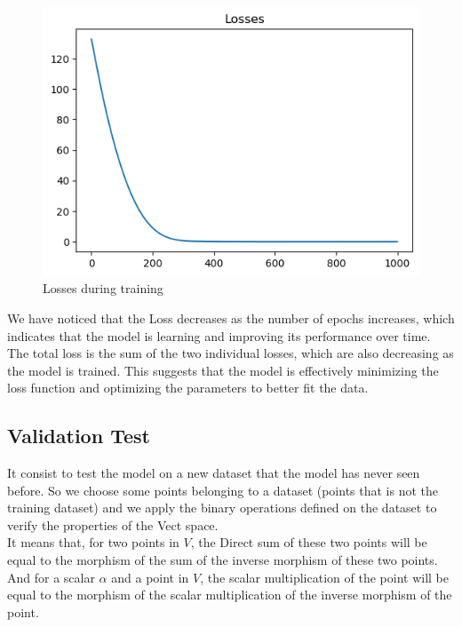 \documentclass{article}
\begin{document}
        \begin{figure}[h]
            \centering
            \includegraphics[width=\textwidth]{./images/losses.png}
            \caption{Losses during training}
            \label{fig:losses}
        \end{figure}

            \newpage


            We have noticed that the Loss decreases as the number of epochs increases, which indicates that the model is learning and improving its performance over time. The total loss is the sum of the two individual losses, which are also decreasing as the model is trained. This suggests that the model is effectively minimizing the loss function and optimizing the parameters to better fit the data.

        \subsection{Validation Test}

            It consist to test the model on a new dataset that the model has never seen before. So we choose some points belonging to a dataset (points that is not the training dataset) and we apply the binary operations defined on the dataset to verify the properties of the Vect space. \\
            It means that, for two points in $V$, the Direct sum of these two points will be equal to the morphism of the sum of the inverse morphism of these two points. And for a scalar $\alpha$ and a point in $V$, the scalar multiplication of the point will be equal to the morphism of the scalar multiplication of the inverse morphism of the point.
\end{document}
